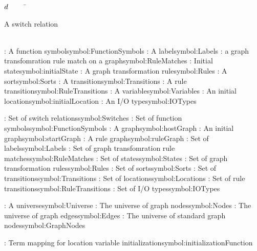 \begin{tabbing}

$d$~~~~~\=\parbox{5in}{A switch relation\dotfill \pageref{symbol:Switches}}\\
\addsymbol \functionSymbol: {A function symbol}{symbol:FunctionSymbols}
\addsymbol \ltsLabel: {A label}{symbol:Labels}
\addsymbol {}: {a graph transfomration rule match on a graph}{symbol:RuleMatches}
\addsymbol \initialState: {Initial state}{symbol:initialState}
\addsymbol \ggrule: {A graph transformation rule}{symbol:Rules}
\addsymbol \sort: {A sort}{symbol:Sorts}
\addsymbol \transition: {A transition}{symbol:Transitions}
\addsymbol {}: {A rule transition}{symbol:RuleTransitions}
\addsymbol \variable: {A variable}{symbol:Variables}
\addsymbol \initialLocation: {An initial location}{symbol:initialLocation}
\addsymbol \iotype: {An I/O type}{symbol:IOTypes}

\addsymbol \Switches: {Set of switch relations}{symbol:Switches}
\addsymbol \FunctionSymbols: {Set of function symbols}{symbol:FunctionSymbols}
\addsymbol \hostGraph: {A graph}{symbol:hostGraph}
\addsymbol \startGraph: {An initial graph}{symbol:startGraph}
\addsymbol {}: {A rule graph}{symbol:ruleGraph}
\addsymbol \Labels: {Set of labels}{symbol:Labels}
\addsymbol \RuleMatches: {Set of graph transfomration rule matches}{symbol:RuleMatches}
\addsymbol \States: {Set of states}{symbol:States}
\addsymbol \Rules: {Set of graph transformation rules}{symbol:Rules}
\addsymbol \Sorts: {Set of sorts}{symbol:Sorts}
\addsymbol \Transitions: {Set of transitions}{symbol:Transitions}
\addsymbol \Locations: {Set of locations}{symbol:Locations}
\addsymbol \RuleTransitions: {Set of rule transitions}{symbol:RuleTransitions}
\addsymbol \IOTypes: {Set of I/O types}{symbol:IOTypes}

\addsymbol {}: {A universe}{symbol:Universe}
\addsymbol \Nodes: {The universe of graph nodes}{symbol:Nodes}
\addsymbol \Edges: {The universe of graph edges}{symbol:Edges}
\addsymbol \GraphNodes: {The universe of standard graph nodes}{symbol:GraphNodes}

\addsymbol \initializationFunction: {Term mapping for location variable initialization}{symbol:initializationFunction}


\end{tabbing}
